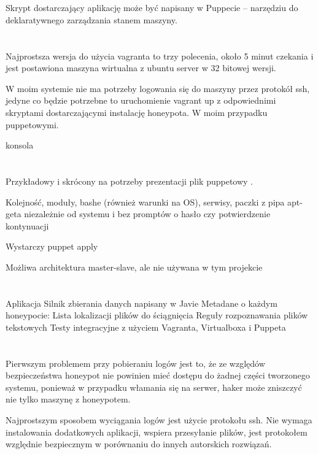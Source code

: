\documentclass[runningheads,a4paper]{llncs}
\begin{document}
\section{}

Skrypt dostarczający aplikację może być napisany w Puppecie – narzędziu do deklaratywnego zarządzania stanem maszyny.
\section{}
Najprostsza wersja do użycia vagranta to trzy polecenia, około 5 minut czekania i jest postawiona maszyna wirtualna z ubuntu server w 32 bitowej wersji.

W moim systemie nie ma potrzeby logowania się do maszyny przez protokół ssh, jedyne co będzie potrzebne to uruchomienie vagrant up z odpowiednimi skryptami dostarczającymi instalację honeypota. W moim przypadku puppetowymi.

konsola
\section{}
Przykładowy i skrócony na potrzeby prezentacji plik puppetowy .

Kolejność, moduły, bashe (również warunki na OS), serwisy, paczki z pipa apt-geta niezależnie od systemu i bez promptów o hasło czy potwierdzenie kontynuacji

Wystarczy puppet apply

Możliwa architektura master-slave, ale nie używana w tym projekcie

\section{}
Aplikacja
Silnik zbierania danych napisany w Javie
Metadane o każdym honeypocie:
Lista lokalizacji plików do ściągnięcia
Reguły rozpoznawania plików tekstowych
Testy integracyjne z użyciem Vagranta, Virtualboxa i Puppeta
\section{}
Pierwszym problemem przy pobieraniu logów jest to, że ze względów bezpieczeństwa honeypot nie powinien mieć dostępu do żadnej części tworzonego systemu, ponieważ w przypadku włamania się na serwer, haker może zniszczyć nie tylko maszynę z honeypotem.

Najprostszym sposobem wyciągania logów jest użycie protokołu ssh. Nie wymaga instalowania dodatkowych aplikacji, wspiera przesyłanie plików, jest protokołem względnie bezpiecznym w porównaniu do innych autorskich rozwiązań.
\end{document}
